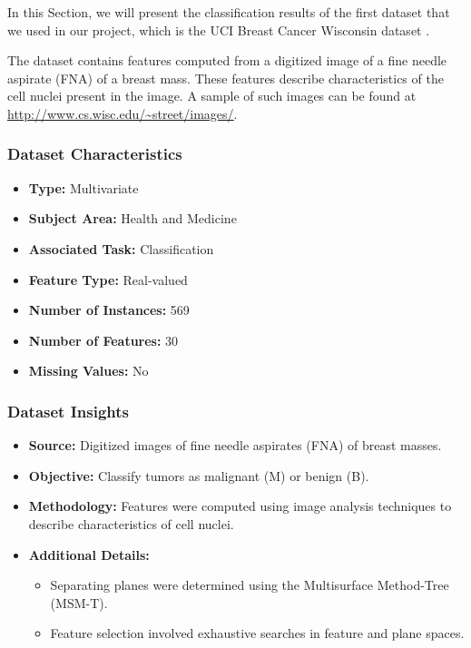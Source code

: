 \newpage
\setcounter{section}{1}

In this Section, we will present the classification results of the first dataset that we used in our project, which is the UCI Breast Cancer Wisconsin dataset \cite{breast_cancer_wisconsin}.

The dataset contains features computed from a digitized image of a fine needle aspirate (FNA) of a breast mass. These features describe characteristics of the cell nuclei present in the image. A sample of such images can be found at \url{http://www.cs.wisc.edu/~street/images/}.

\subsubsection*{Dataset Characteristics}
\begin{itemize}
    \item \textbf{Type:} Multivariate
    \item \textbf{Subject Area:} Health and Medicine
    \item \textbf{Associated Task:} Classification
    \item \textbf{Feature Type:} Real-valued
    \item \textbf{Number of Instances:} 569
    \item \textbf{Number of Features:} 30
    \item \textbf{Missing Values:} No
\end{itemize}

\subsubsection*{Dataset Insights}
\begin{itemize}
    \item \textbf{Source:} Digitized images of fine needle aspirates (FNA) of breast masses.
    \item \textbf{Objective:} Classify tumors as malignant (M) or benign (B).
    \item \textbf{Methodology:} Features were computed using image analysis techniques to describe characteristics of cell nuclei.
    \item \textbf{Additional Details:}
    \begin{itemize}
        \item Separating planes were determined using the Multisurface Method-Tree (MSM-T).
        \item Feature selection involved exhaustive searches in feature and plane spaces.
    \end{itemize}
\end{itemize}

